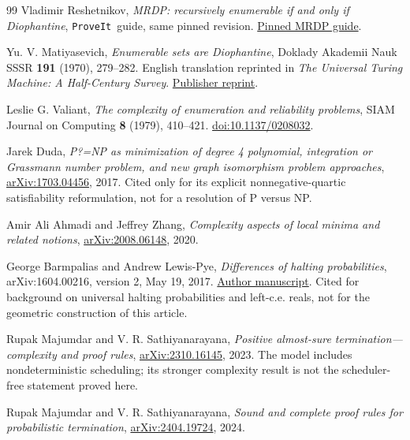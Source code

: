 \documentclass[11pt,letterpaper]{article}
\numberwithin{equation}{section}
\theoremstyle{definition}
\theoremstyle{remark}
\newcommand{\reponame}{\texttt{ProveIt}}
\begin{document}
\begin{thebibliography}{99}
Vladimir Reshetnikov, \emph{MRDP: recursively enumerable if and only if
Diophantine}, \reponame\ guide, same pinned revision.
\href{https://github.com/VladimirReshetnikov/ProveIt/blob/b998f70c6886e6a00339a6f4a02ed8625324d357/Computability/HilbertTenthProblem/Lean/MRDP.md}{Pinned MRDP guide}.

Yu. V. Matiyasevich, \emph{Enumerable sets are Diophantine},
Doklady Akademii Nauk SSSR \textbf{191} (1970), 279--282.
English translation reprinted in \emph{The Universal Turing Machine:
A Half-Century Survey}.
\href{https://doi.org/10.1142/9789812564894_0013}{Publisher reprint}.

Leslie G. Valiant, \emph{The complexity of enumeration and reliability
problems}, SIAM Journal on Computing \textbf{8} (1979), 410--421.
\href{https://doi.org/10.1137/0208032}{doi:10.1137/0208032}.

Jarek Duda, \emph{P?=NP as minimization of degree 4 polynomial, integration
or Grassmann number problem, and new graph isomorphism problem approaches},
\href{https://arxiv.org/abs/1703.04456}{arXiv:1703.04456}, 2017.
Cited only for its explicit nonnegative-quartic satisfiability
reformulation, not for a resolution of P versus NP.

Amir Ali Ahmadi and Jeffrey Zhang, \emph{Complexity aspects of local
minima and related notions},
\href{https://arxiv.org/abs/2008.06148}{arXiv:2008.06148}, 2020.

George Barmpalias and Andrew Lewis-Pye,
\emph{Differences of halting probabilities}, arXiv:1604.00216,
version 2, May 19, 2017.
\href{https://arxiv.org/abs/1604.00216}{Author manuscript}.
Cited for background on universal halting probabilities and left-c.e.
reals, not for the geometric construction of this article.

Rupak Majumdar and V. R. Sathiyanarayana,
\emph{Positive almost-sure termination---complexity and proof rules},
\href{https://arxiv.org/abs/2310.16145}{arXiv:2310.16145}, 2023.
The model includes nondeterministic scheduling; its stronger complexity
result is not the scheduler-free statement proved here.

Rupak Majumdar and V. R. Sathiyanarayana,
\emph{Sound and complete proof rules for probabilistic termination},
\href{https://arxiv.org/abs/2404.19724}{arXiv:2404.19724}, 2024.


\end{thebibliography}
\end{document}
